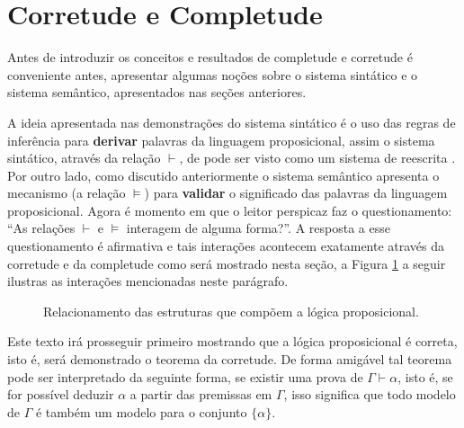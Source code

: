\section{Corretude e Completude}\label{sec:CorretudeCompletudeProposicional}

Antes de introduzir os conceitos e resultados de completude e corretude é conveniente antes, apresentar algumas noções sobre o sistema sintático e o sistema semântico, apresentados nas seções anteriores. 

A ideia apresentada nas demonstrações do sistema sintático é o uso das regras de inferência para \textbf{derivar} palavras da linguagem proposicional, assim o sistema sintático, através da relação $\vdash$, de pode ser visto como um sistema de reescrita \cite{ayala2014}. Por outro lado, como discutido anteriormente o sistema semântico apresenta o mecanismo (a relação $\vDash$) para \textbf{validar} o significado das palavras da linguagem proposicional. Agora é momento em que o leitor perspicaz faz o questionamento: ``As relações $\vdash$ e $\vDash$ interagem de alguma forma?''. A resposta a esse questionamento é afirmativa e tais interações acontecem exatamente através da corretude e da completude como será mostrado nesta seção, a Figura \ref{fig:LogicaProposicional} a seguir ilustras as interações mencionadas neste parágrafo.

\begin{figure}[H]
  \centering
  \caption{Relacionamento das estruturas que compõem a lógica proposicional.}
  \label{fig:LogicaProposicional}
\end{figure}

Este texto irá prosseguir primeiro mostrando que a lógica proposicional é correta, isto é, será demonstrado o teorema da corretude. De forma amigável tal teorema pode ser interpretado da seguinte forma, se existir uma prova de $\Gamma \vdash \alpha$, isto é, se for possível deduzir $\alpha$ a partir das premissas em $\Gamma$, isso significa que todo modelo de $\Gamma$ é também um modelo para o conjunto $\{\alpha\}$.

